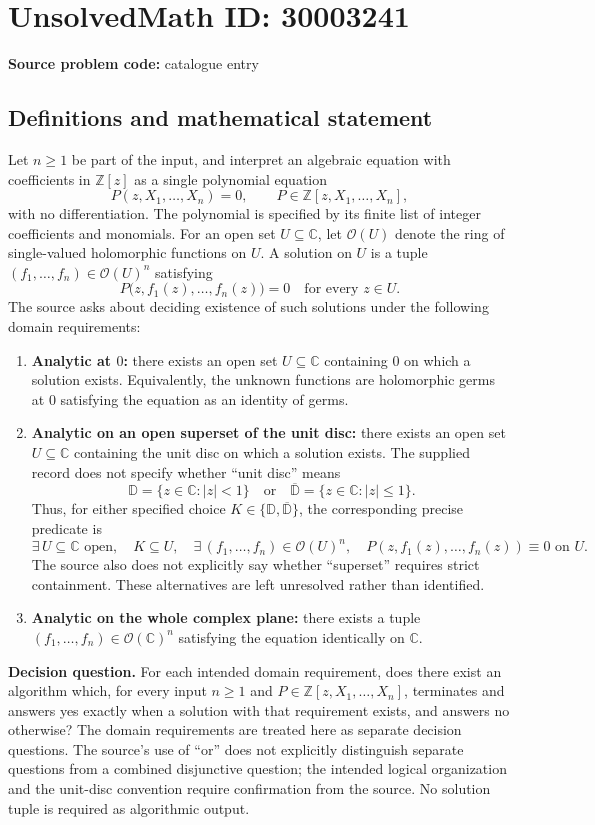 \documentclass[11pt]{article}
\newcommand{\Z}{\mathbb{Z}}
\newcommand{\C}{\mathbb{C}}
\begin{document}
\section*{UnsolvedMath ID: 30003241}
\textbf{Source problem code:} catalogue entry
\subsection{Definitions and mathematical statement}
Let \(n\geq 1\) be part of the input, and interpret an algebraic equation with coefficients in \(\Z[z]\) as a single polynomial equation
\[
P(z,X_1,\ldots,X_n)=0,
\qquad P\in\Z[z,X_1,\ldots,X_n],
\]
with no differentiation. The polynomial is specified by its finite list of integer coefficients and monomials. For an open set \(U\subseteq\C\), let \(\mathcal O(U)\) denote the ring of single-valued holomorphic functions on \(U\). A solution on \(U\) is a tuple \((f_1,\ldots,f_n)\in\mathcal O(U)^n\) satisfying
\[
P\bigl(z,f_1(z),\ldots,f_n(z)\bigr)=0
\quad\text{for every }z\in U.
\]
The source asks about deciding existence of such solutions under the following domain requirements:
\begin{enumerate}
\item \textbf{Analytic at \(0\):} there exists an open set \(U\subseteq\C\) containing \(0\) on which a solution exists. Equivalently, the unknown functions are holomorphic germs at \(0\) satisfying the equation as an identity of germs.
\item \textbf{Analytic on an open superset of the unit disc:} there exists an open set \(U\subseteq\C\) containing the unit disc on which a solution exists. The supplied record does not specify whether ``unit disc'' means
\[
\mathbb D=\{z\in\C:|z|<1\}
\quad\text{or}\quad
\overline{\mathbb D}=\{z\in\C:|z|\leq1\}.
\]
Thus, for either specified choice \(K\in\{\mathbb D,\overline{\mathbb D}\}\), the corresponding precise predicate is
\[
\exists\,U\subseteq\C\text{ open},\quad
K\subseteq U,\quad
\exists\,(f_1,\ldots,f_n)\in\mathcal O(U)^n,
\quad P(z,f_1(z),\ldots,f_n(z))\equiv0\text{ on }U.
\]
The source also does not explicitly say whether ``superset'' requires strict containment. These alternatives are left unresolved rather than identified.
\item \textbf{Analytic on the whole complex plane:} there exists a tuple \((f_1,\ldots,f_n)\in\mathcal O(\C)^n\) satisfying the equation identically on \(\C\).
\end{enumerate}
\textbf{Decision question.} For each intended domain requirement, does there exist an algorithm which, for every input \(n\geq1\) and \(P\in\Z[z,X_1,\ldots,X_n]\), terminates and answers yes exactly when a solution with that requirement exists, and answers no otherwise? The domain requirements are treated here as separate decision questions. The source's use of ``or'' does not explicitly distinguish separate questions from a combined disjunctive question; the intended logical organization and the unit-disc convention require confirmation from the source. No solution tuple is required as algorithmic output.
\end{document}
